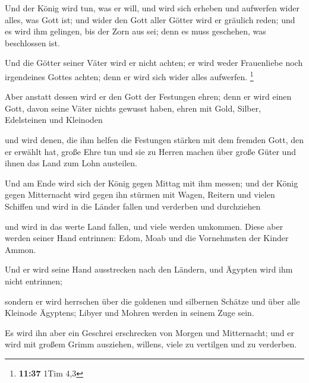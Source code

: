  Und der König wird tun, was er will, und wird sich erheben
und aufwerfen wider alles, was Gott ist; und wider den Gott aller Götter
wird er gräulich reden; und es wird ihm gelingen, bis der Zorn aus sei;
denn es muss geschehen, was beschlossen ist.

 Und die Götter seiner Väter wird er nicht achten; er wird
weder Frauenliebe noch irgendeines Gottes achten; denn er wird sich
wider alles aufwerfen. \footnote{\textbf{11:37} 1Tim 4,3}

 Aber anstatt dessen wird er den Gott der Festungen ehren;
denn er wird einen Gott, davon seine Väter nichts gewusst haben, ehren
mit Gold, Silber, Edelsteinen und Kleinoden

 und wird denen, die ihm helfen die Festungen stärken mit
dem fremden Gott, den er erwählt hat, große Ehre tun und sie zu Herren
machen über große Güter und ihnen das Land zum Lohn austeilen.

 Und am Ende wird sich der König gegen Mittag mit ihm
messen; und der König gegen Mitternacht wird gegen ihn stürmen mit
Wagen, Reitern und vielen Schiffen und wird in die Länder fallen und
verderben und durchziehen

 und wird in das werte Land fallen, und viele werden
umkommen. Diese aber werden seiner Hand entrinnen: Edom, Moab und die
Vornehmsten der Kinder Ammon.

 Und er wird seine Hand ausstrecken nach den Ländern, und
Ägypten wird ihm nicht entrinnen;

 sondern er wird herrschen über die goldenen und silbernen
Schätze und über alle Kleinode Ägyptens; Libyer und Mohren werden in
seinem Zuge sein.

 Es wird ihn aber ein Geschrei erschrecken von Morgen und
Mitternacht; und er wird mit großem Grimm ausziehen, willens, viele zu
vertilgen und zu verderben.

